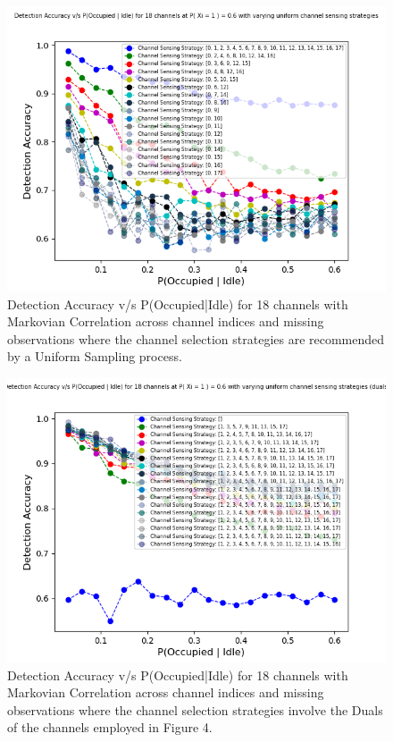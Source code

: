 \documentclass[12pt, draftcls, onecolumn]{IEEEtran}
\begin{document}
\begin{figure}[t]
\includegraphics[width=1.0\textwidth]{Uniform_Channel_Sensing.png}
\caption{Detection Accuracy v/s P(Occupied|Idle) for 18 channels with Markovian Correlation across channel indices and missing observations where the channel selection strategies are recommended by a Uniform Sampling process.}
\label{fig:mesh4}
\centering
\end{figure}
\begin{figure}[t]
\includegraphics[width=1.0\textwidth]{Uniform_Channel_Sensing_Duals.png}
\caption{Detection Accuracy v/s P(Occupied|Idle) for 18 channels with Markovian Correlation across channel indices and missing observations where the channel selection strategies involve the Duals of the channels employed in Figure 4.}
\label{fig:mesh5}
\centering
\end{figure}
\end{document}
